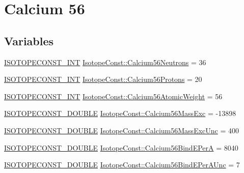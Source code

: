 \hypertarget{group___isotope_const-_calcium-_ca56}{}\section{Calcium 56}
\label{group___isotope_const-_calcium-_ca56}
\subsection*{Variables}
\begin{DoxyCompactItemize}
\item 
\mbox{\hyperlink{group___isotope_const-_macros_ga5f18360b3e99483a35c32d789e62621c}{I\+S\+O\+T\+O\+P\+E\+C\+O\+N\+S\+T\+\_\+\+I\+NT}} \mbox{\hyperlink{group___isotope_const-_calcium-_ca56_gaedcc9d55aacb2dbd2abefe5e55d9f530}{Isotope\+Const\+::\+Calcium56\+Neutrons}} = 36
\item 
\mbox{\hyperlink{group___isotope_const-_macros_ga5f18360b3e99483a35c32d789e62621c}{I\+S\+O\+T\+O\+P\+E\+C\+O\+N\+S\+T\+\_\+\+I\+NT}} \mbox{\hyperlink{group___isotope_const-_calcium-_ca56_gaa0ae750d3c6d0648b5f11b874dadf1cb}{Isotope\+Const\+::\+Calcium56\+Protons}} = 20
\item 
\mbox{\hyperlink{group___isotope_const-_macros_ga5f18360b3e99483a35c32d789e62621c}{I\+S\+O\+T\+O\+P\+E\+C\+O\+N\+S\+T\+\_\+\+I\+NT}} \mbox{\hyperlink{group___isotope_const-_calcium-_ca56_ga0a9504d114df0c5ea1c232a277704442}{Isotope\+Const\+::\+Calcium56\+Atomic\+Weight}} = 56
\item 
\mbox{\hyperlink{group___isotope_const-_macros_ga8f45a7272ce02c0b4c65c44636ed719a}{I\+S\+O\+T\+O\+P\+E\+C\+O\+N\+S\+T\+\_\+\+D\+O\+U\+B\+LE}} \mbox{\hyperlink{group___isotope_const-_calcium-_ca56_ga9387ccd36f8b3db05954245c2389c5da}{Isotope\+Const\+::\+Calcium56\+Mass\+Exc}} = -\/13898
\item 
\mbox{\hyperlink{group___isotope_const-_macros_ga8f45a7272ce02c0b4c65c44636ed719a}{I\+S\+O\+T\+O\+P\+E\+C\+O\+N\+S\+T\+\_\+\+D\+O\+U\+B\+LE}} \mbox{\hyperlink{group___isotope_const-_calcium-_ca56_ga07f2f2dd698088c9c36319db9d322f17}{Isotope\+Const\+::\+Calcium56\+Mass\+Exc\+Unc}} = 400
\item 
\mbox{\hyperlink{group___isotope_const-_macros_ga8f45a7272ce02c0b4c65c44636ed719a}{I\+S\+O\+T\+O\+P\+E\+C\+O\+N\+S\+T\+\_\+\+D\+O\+U\+B\+LE}} \mbox{\hyperlink{group___isotope_const-_calcium-_ca56_ga6b3adbbc83c3683d8bab47c847dbf985}{Isotope\+Const\+::\+Calcium56\+Bind\+E\+PerA}} = 8040
\item 
\mbox{\hyperlink{group___isotope_const-_macros_ga8f45a7272ce02c0b4c65c44636ed719a}{I\+S\+O\+T\+O\+P\+E\+C\+O\+N\+S\+T\+\_\+\+D\+O\+U\+B\+LE}} \mbox{\hyperlink{group___isotope_const-_calcium-_ca56_ga5b426b4ff0e88a3c4710fc9dce39acc3}{Isotope\+Const\+::\+Calcium56\+Bind\+E\+Per\+A\+Unc}} = 7

\end{DoxyCompactItemize}
